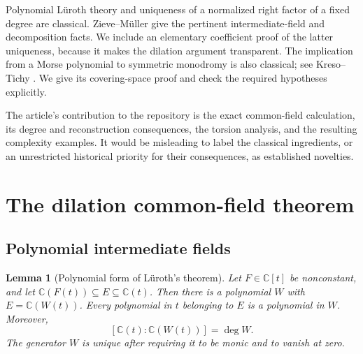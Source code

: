 \documentclass[11pt,letterpaper]{article}
\newtheorem{lemma}[theorem]{Lemma}
\theoremstyle{definition}
\theoremstyle{remark}
\newcommand{\C}{\mathbb C}
\begin{document}
Polynomial L\"uroth theory and uniqueness of a normalized right factor of a fixed
degree are classical. Zieve--M\"uller \cite[Lemma 2.2, Corollary 2.9 and
Remark 2.16]{ZM2008} give the pertinent intermediate-field and decomposition
facts. We include an elementary coefficient proof of the latter uniqueness, because
it makes the dilation argument transparent. The implication from a Morse polynomial
to symmetric monodromy is also classical; see Kreso--Tichy \cite{KT2016}.
We give its covering-space proof and check the required hypotheses explicitly.

The article's contribution to the repository is the exact common-field calculation,
its degree and reconstruction consequences, the torsion analysis, and the resulting
complexity examples. It would be misleading to label the classical ingredients, or
an unrestricted historical priority for their consequences, as established novelties.

\section{The dilation common-field theorem}
\label{nrr:ed:sec:field}

\subsection{Polynomial intermediate fields}

\begin{lemma}[Polynomial form of L\"uroth's theorem]
\label{nrr:ed:lem:luroth}
Let $F\in\C[t]$ be nonconstant, and let
$\C(F(t))\subseteq E\subseteq\C(t)$. Then there is a polynomial $W$ with
$E=\C(W(t))$. Every polynomial in $t$ belonging to $E$ is a polynomial in $W$.
Moreover,
\[
 [\C(t):\C(W(t))]=\deg W.
\]
The generator $W$ is unique after requiring it to be monic and to vanish at zero.
\end{lemma}
\end{document}
